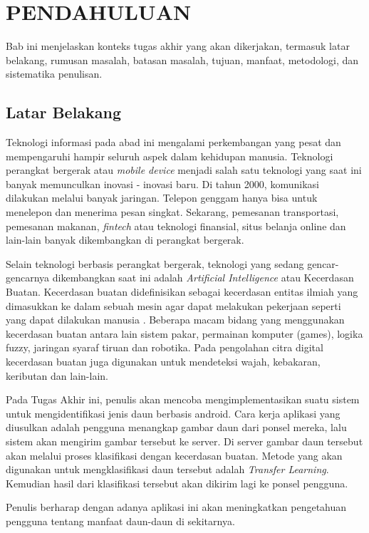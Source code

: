 \vspace{0ex}
\chapter {PENDAHULUAN}

Bab ini menjelaskan konteks tugas akhir yang akan dikerjakan, termasuk latar belakang, rumusan masalah, batasan masalah, tujuan, manfaat, metodologi, dan sistematika penulisan.

\section{Latar Belakang}
\par Teknologi informasi pada abad ini mengalami perkembangan yang pesat dan mempengaruhi hampir seluruh aspek dalam kehidupan manusia. Teknologi perangkat bergerak atau \textit{mobile device} menjadi salah satu teknologi yang saat ini banyak memunculkan inovasi - inovasi baru. Di tahun 2000, komunikasi dilakukan melalui banyak jaringan. Telepon genggam hanya bisa untuk menelepon dan menerima pesan singkat. Sekarang, pemesanan transportasi, pemesanan makanan, \textit{fintech} atau teknologi finansial, situs belanja online dan lain-lain banyak dikembangkan di perangkat bergerak.  

\par Selain teknologi berbasis perangkat bergerak, teknologi yang sedang gencar-gencarnya dikembangkan saat ini adalah \textit{Artificial Intelligence} atau Kecerdasan Buatan. Kecerdasan buatan didefinisikan sebagai kecerdasan entitas ilmiah yang dimasukkan ke dalam sebuah mesin agar dapat melakukan pekerjaan seperti yang dapat dilakukan manusia \cite{ai_def}. Beberapa macam bidang yang menggunakan kecerdasan buatan antara lain sistem pakar, permainan komputer (games), logika fuzzy, jaringan syaraf tiruan dan robotika. Pada pengolahan citra digital kecerdasan buatan juga digunakan untuk mendeteksi wajah, kebakaran, keributan dan lain-lain.
\par Pada Tugas Akhir ini, penulis akan mencoba mengimplementasikan suatu sistem untuk mengidentifikasi jenis daun berbasis android. Cara kerja aplikasi yang diusulkan adalah pengguna menangkap gambar daun dari ponsel mereka, lalu sistem akan mengirim gambar tersebut ke server. Di server gambar daun tersebut akan melalui proses klasifikasi dengan kecerdasan buatan. Metode yang akan digunakan untuk mengklasifikasi daun tersebut adalah \textit{Transfer Learning}. Kemudian hasil dari klasifikasi tersebut akan dikirim lagi ke ponsel pengguna. 
\par Penulis berharap dengan adanya aplikasi ini akan meningkatkan pengetahuan pengguna tentang manfaat daun-daun di sekitarnya.

